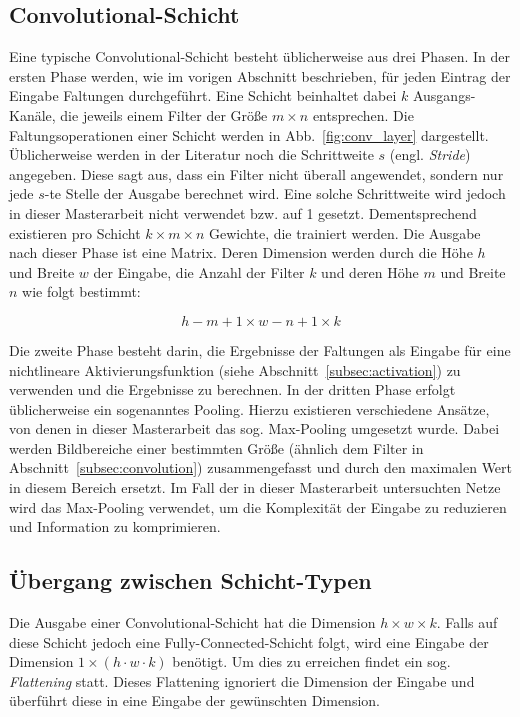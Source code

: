 \subsection{Convolutional-Schicht}
\label{subsec:conv-layer}
Eine typische Convolutional-Schicht besteht üblicherweise aus drei Phasen. In der ersten Phase werden, wie im vorigen Abschnitt beschrieben, für jeden Eintrag der Eingabe Faltungen durchgeführt. Eine Schicht beinhaltet dabei $k$ Ausgangs-Kanäle, die jeweils einem Filter der Größe $m \times n$ entsprechen. Die Faltungsoperationen einer Schicht werden in Abb.~\ref{fig:conv_layer} dargestellt. Üblicherweise werden in der Literatur noch die Schrittweite $s$ (engl. \emph{Stride}) angegeben. Diese sagt aus, dass ein Filter nicht überall angewendet, sondern nur jede $s$-te Stelle der Ausgabe berechnet wird. Eine solche Schrittweite wird jedoch in dieser Masterarbeit nicht verwendet bzw. auf 1 gesetzt. Dementsprechend existieren pro Schicht $k \times m \times n$ Gewichte, die trainiert werden.
Die Ausgabe nach dieser Phase ist eine Matrix. Deren Dimension werden durch die Höhe $h$ und Breite $w$ der Eingabe, die Anzahl der Filter $k$ und deren Höhe $m$ und Breite $n$ wie folgt bestimmt:




\begin{displaymath}
    h - m + 1 \times w - n + 1 \times k
\end{displaymath}

Die zweite Phase besteht darin, die Ergebnisse der Faltungen als Eingabe für eine nichtlineare Aktivierungsfunktion (siehe Abschnitt~\ref{subsec:activation}) zu verwenden und die Ergebnisse zu berechnen. In der dritten Phase erfolgt üblicherweise ein sogenanntes Pooling. Hierzu existieren verschiedene Ansätze, von denen in dieser Masterarbeit das sog. Max-Pooling umgesetzt wurde. Dabei werden Bildbereiche einer bestimmten Größe (ähnlich dem Filter in Abschnitt~\ref{subsec:convolution}) zusammengefasst und durch den maximalen Wert in diesem Bereich ersetzt. Im Fall der in dieser Masterarbeit untersuchten Netze wird das Max-Pooling verwendet, um die Komplexität der Eingabe zu reduzieren und Information zu komprimieren.


\subsection{Übergang zwischen Schicht-Typen}
\label{subsec:flattening}
Die Ausgabe einer Convolutional-Schicht hat die Dimension $h \times w \times k$. Falls auf diese Schicht jedoch eine Fully-Connected-Schicht folgt, wird eine Eingabe der Dimension $1 \times (h \cdot w \cdot k)$ benötigt. Um dies zu erreichen findet ein sog. \emph{Flattening} statt. Dieses Flattening ignoriert die Dimension der Eingabe und überführt diese in eine Eingabe der gewünschten Dimension.

